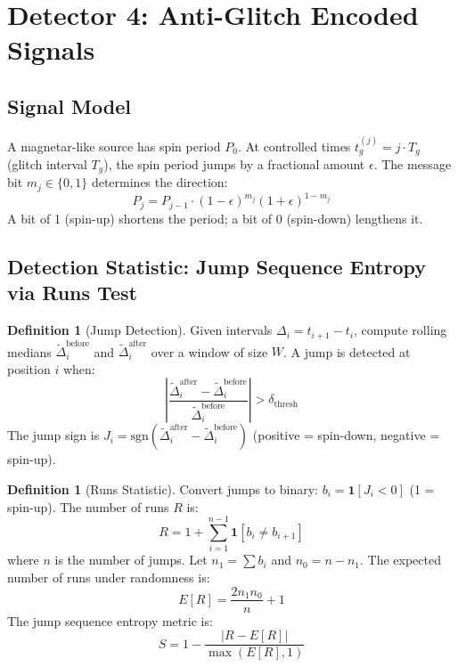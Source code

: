\documentclass[11pt]{article}
\theoremstyle{definition}
\newtheorem{definition}[theorem]{Definition}
\begin{document}
\section{Detector 4: Anti-Glitch Encoded Signals}

\subsection{Signal Model}

A magnetar-like source has spin period $P_0$. At controlled times $t_g^{(j)} = j \cdot T_g$ (glitch interval $T_g$), the spin period jumps by a fractional amount $\epsilon$. The message bit $m_j \in \{0, 1\}$ determines the direction:
\begin{equation}
P_j = P_{j-1} \cdot (1 - \epsilon)^{m_j} (1 + \epsilon)^{1 - m_j}
\end{equation}
A bit of 1 (spin-up) shortens the period; a bit of 0 (spin-down) lengthens it.

\subsection{Detection Statistic: Jump Sequence Entropy via Runs Test}

\begin{definition}[Jump Detection]
Given intervals $\Delta_i = t_{i+1} - t_i$, compute rolling medians $\tilde{\Delta}_i^{\text{before}}$ and $\tilde{\Delta}_i^{\text{after}}$ over a window of size $W$. A jump is detected at position $i$ when:
\begin{equation}
\left|\frac{\tilde{\Delta}_i^{\text{after}} - \tilde{\Delta}_i^{\text{before}}}{\tilde{\Delta}_i^{\text{before}}}\right| > \delta_{\text{thresh}}
\end{equation}
The jump sign is $J_i = \mathrm{sgn}(\tilde{\Delta}_i^{\text{after}} - \tilde{\Delta}_i^{\text{before}})$ (positive = spin-down, negative = spin-up).
\end{definition}

\begin{definition}[Runs Statistic]
Convert jumps to binary: $b_i = \mathbf{1}[J_i < 0]$ (1 = spin-up). The number of runs $R$ is:
\begin{equation}
R = 1 + \sum_{i=1}^{n-1} \mathbf{1}[b_i \neq b_{i+1}]
\end{equation}
where $n$ is the number of jumps. Let $n_1 = \sum b_i$ and $n_0 = n - n_1$. The expected number of runs under randomness is:
\begin{equation}
E[R] = \frac{2 n_1 n_0}{n} + 1
\end{equation}
The jump sequence entropy metric is:
\begin{equation}
S = 1 - \frac{|R - E[R]|}{\max(E[R], 1)}
\end{equation}
\end{definition}
\end{document}

